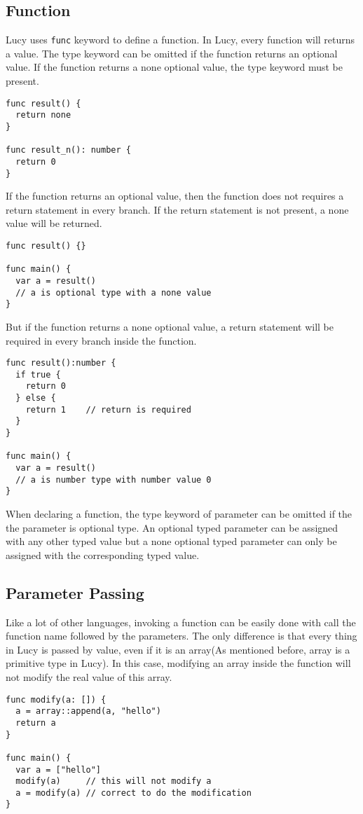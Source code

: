 \subsection{Function}
Lucy uses \texttt{func} keyword to define a function. In Lucy, every function will returns a value. The type keyword can be omitted if the function returns an optional value. If the function returns a none optional value, the type keyword must be present.
\begin{lstlisting}
func result() {
  return none
}

func result_n(): number {
  return 0
}
\end{lstlisting}
If the function returns an optional value, then the function does not requires a return statement in every branch. If the return statement is not present, a none value will be returned.
\begin{lstlisting}
func result() {}

func main() {
  var a = result()
  // a is optional type with a none value
}
\end{lstlisting}
But if the function returns a none optional value, a return statement will be required in every branch inside the function.
\begin{lstlisting}
func result():number {
  if true {
    return 0
  } else {
    return 1    // return is required
  }
}

func main() {
  var a = result()
  // a is number type with number value 0
}
\end{lstlisting}
When declaring a function, the type keyword of parameter can be omitted if the the parameter is optional type. An optional typed parameter can be assigned with any other typed value but a none optional typed parameter can only be assigned with the corresponding typed value.

\subsection{Parameter Passing}
Like a lot of other languages, invoking a function can be easily done with call the function name followed by the parameters. The only difference is that every thing in Lucy is passed by value, even if it is an array(As mentioned before, array is a primitive type in Lucy). In this case, modifying an array inside the function will not modify the real value of this array.
\begin{lstlisting}
func modify(a: []) {
  a = array::append(a, "hello")
  return a
}

func main() {
  var a = ["hello"]
  modify(a)     // this will not modify a
  a = modify(a) // correct to do the modification
}
\end{lstlisting}



